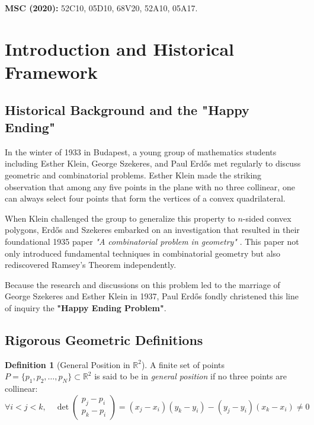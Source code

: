 \documentclass[11pt,a4paper]{article}
\theoremstyle{definition}
\newtheorem{definition}[theorem]{Definition}
\begin{document}
\noindent\textbf{MSC (2020):} 52C10, 05D10, 68V20, 52A10, 05A17.

\tableofcontents
\newpage

\section{Introduction and Historical Framework}

\subsection{Historical Background and the "Happy Ending"}
In the winter of 1933 in Budapest, a young group of mathematics students including Esther Klein, George Szekeres, and Paul Erd\H{o}s met regularly to discuss geometric and combinatorial problems. Esther Klein made the striking observation that among any five points in the plane with no three collinear, one can always select four points that form the vertices of a convex quadrilateral.

When Klein challenged the group to generalize this property to $n$-sided convex polygons, Erd\H{o}s and Szekeres embarked on an investigation that resulted in their foundational 1935 paper \emph{"A combinatorial problem in geometry"} \cite{erdos1935}. This paper not only introduced fundamental techniques in combinatorial geometry but also rediscovered Ramsey's Theorem independently.

Because the research and discussions on this problem led to the marriage of George Szekeres and Esther Klein in 1937, Paul Erd\H{o}s fondly christened this line of inquiry the \textbf{"Happy Ending Problem"}.

\subsection{Rigorous Geometric Definitions}

\begin{definition}[General Position in $\mathbb{R}^2$]\label{def:gen_pos}
A finite set of points $P = \{p_1, p_2, \dots, p_N\} \subset \mathbb{R}^2$ is said to be in \emph{general position} if no three points are collinear:
\begin{equation}\label{eq:gen_pos}
\forall i < j < k, \quad \det \begin{pmatrix} p_j - p_i \\ p_k - p_i \end{pmatrix} = (x_j - x_i)(y_k - y_i) - (y_j - y_i)(x_k - x_i) \ne 0
\end{equation}
\end{definition}
\end{document}
